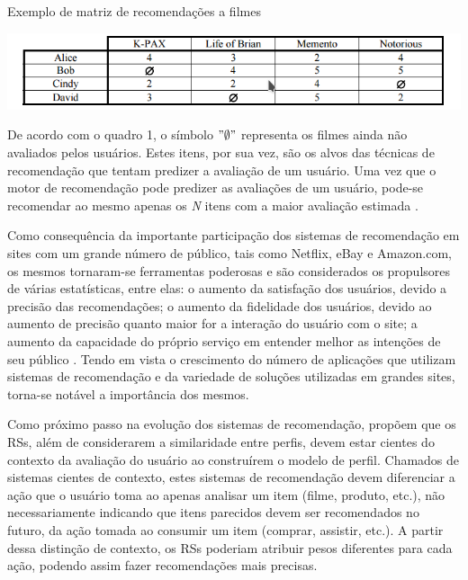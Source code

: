 \documentclass[12pt, openright, oneside, a4paper, brazil]{abntex2}
\begin{document}
\begin{quadro}[h!tp]
	\caption{\label{movie_matrix}Exemplo de matriz de recomendações a filmes}
	\begin{center}
		\includegraphics[scale=0.8]{images/movie_matrix.png}
	\end{center}
\end{quadro}

De acordo com o quadro 1, o símbolo $"\emptyset"$ representa os filmes ainda não avaliados pelos usuários. Estes itens, por sua vez, são os alvos das técnicas de recomendação que tentam predizer a avaliação de um usuário. Uma vez que o motor de recomendação pode predizer as avaliações de um usuário, pode-se recomendar ao mesmo apenas os \emph{N} itens com a maior avaliação estimada \cite{adomavicius2005toward}.

Como consequência da importante participação dos sistemas de recomendação em sites com um grande número de público, tais como Netflix, eBay e Amazon.com, os mesmos tornaram-se ferramentas poderosas \cite{schafer1999recommender} e são considerados os propulsores de várias estatísticas, entre elas: o aumento da satisfação dos usuários, devido a precisão das recomendações; o aumento da fidelidade dos usuários, devido ao aumento de precisão quanto maior for a interação do usuário com o site; a aumento da capacidade do próprio serviço em entender melhor as intenções de seu público \cite{ricci2011introduction}. Tendo em vista o crescimento do número de aplicações que utilizam sistemas de recomendação e da variedade de soluções utilizadas em grandes sites, torna-se notável a importância dos mesmos.

Como próximo passo na evolução dos sistemas de recomendação,  propõem que os RSs, além de considerarem a similaridade entre perfis, devem estar cientes do contexto da avaliação do usuário ao construírem o modelo de perfil. Chamados de sistemas cientes de contexto, estes sistemas de recomendação devem diferenciar a ação que o usuário toma ao apenas analisar um item (filme, produto, etc.), não necessariamente indicando que itens parecidos devem ser recomendados no futuro, da ação tomada ao consumir um item (comprar, assistir, etc.). A partir dessa distinção de contexto, os RSs poderiam atribuir pesos diferentes para cada ação, podendo assim fazer recomendações mais precisas.
\end{document}
